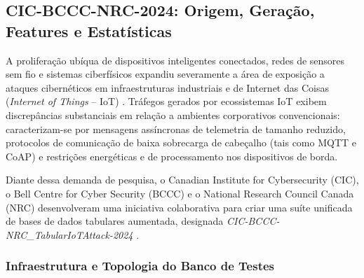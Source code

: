 \subsection{CIC-BCCC-NRC-2024: Origem, Geração, Features e Estatísticas}
\label{subsec:cic_bccc_nrc_2024}

A proliferação ubíqua de dispositivos inteligentes conectados, redes de sensores sem fio e sistemas ciberfísicos expandiu severamente a área de exposição a ataques cibernéticos em infraestruturas industriais e de Internet das Coisas (\emph{Internet of Things} -- IoT) \cite{ciciot2023}. Tráfegos gerados por ecossistemas IoT exibem discrepâncias substanciais em relação a ambientes corporativos convencionais: caracterizam-se por mensagens assíncronas de telemetria de tamanho reduzido, protocolos de comunicação de baixa sobrecarga de cabeçalho (tais como MQTT e CoAP) e restrições energéticas e de processamento nos dispositivos de borda.

Diante dessa demanda de pesquisa, o Canadian Institute for Cybersecurity (CIC), o Bell Centre for Cyber Security (BCCC) e o National Research Council Canada (NRC) desenvolveram uma iniciativa colaborativa para criar uma suíte unificada de bases de dados tabulares aumentada, designada \emph{CIC-BCCC-NRC\_TabularIoTAttack-2024} \cite{sasi2025efficient}.

\subsubsection{Infraestrutura e Topologia do Banco de Testes}

